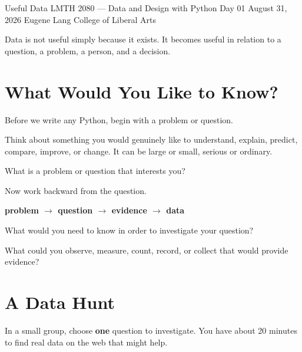 \documentclass[11pt]{article}
\begin{document}
\courseheader
  {Useful Data}
  {LMTH 2080 --- Data and Design with Python}
  {Day 01 \textbullet{} August 31, 2026}
  {Eugene Lang College of Liberal Arts}

\begin{keyidea}
Data is not useful simply because it exists. It becomes useful in relation to
a question, a problem, a person, and a decision.
\end{keyidea}

\section{What Would You Like to Know?}

Before we write any Python, begin with a problem or question.

Think about something you would genuinely like to understand, explain,
predict, compare, improve, or change. It can be large or small, serious or
ordinary.

\vspace{4pt}

\begin{dataprompt}
What is a problem or question that interests you?

\vspace{1.0in}
\end{dataprompt}

Now work backward from the question.

\begin{center}
\Large\bfseries
problem $\longrightarrow$ question $\longrightarrow$ evidence
$\longrightarrow$ data
\end{center}

\questionlabel

What would you need to know in order to investigate your question?

\vspace{0.7in}

\datalabel

What could you observe, measure, count, record, or collect that would provide
evidence?

\vspace{0.7in}

\section{A Data Hunt}

In a small group, choose \textbf{one} question to investigate. You have about
20 minutes to find real data on the web that might help.
\end{document}
